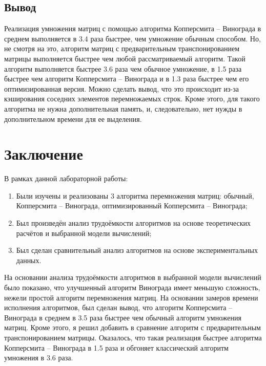 \documentclass[12pt]{report}
\begin{document}
\section{Вывод}

Реализация умножения матриц с помощью алгоритма Копперсмита -- Винограда в среднем выполняется в 3.4 раза быстрее, чем умножение обычным способом. Но, не смотря на это, алгоритм матриц с предварительным транспонированием матрицы выполняется быстрее чем любой рассматриваемый алгоритм. Такой алгоритм выполняется быстрее 3.6 раза чем обычное умножение, в 1.5 раза быстрее чем алгоритм Копперсмита -- Винограда и в 1.3 раза быстрее чем его оптимизированная версия. Можно сделать вывод, что это происходит из-за кэширования соседних элементов перемножаемых строк. Кроме этого, для такого алгоритма не нужна дополнительная память, и, следовательно, нет нужды в дополнительном времени для ее выделения.

\chapter*{Заключение}

В рамках данной лабораторной работы:

\begin{enumerate}
	\item Были изучены и реализованы 3 алгоритма перемножения матриц: обычный, Копперсмита -- Винограда, оптимизированный Копперсмита -- Винограда;
	\item Был произведён анализ трудоёмкости алгоритмов на основе теоретических расчётов и выбранной модели вычислений;
	\item Был сделан сравнительный анализ алгоритмов на основе экспериментальных данных.
\end{enumerate}

На основании анализа трудоёмкости алгоритмов в выбранной модели вычислений было показано, что улучшенный алгоритм Винограда имеет меньшую сложность, нежели простой алгоритм перемножения матриц. На основании замеров времени исполнения алгоритмов, был сделан вывод, что алгоритм Копперсмита -- Винограда в среднем в 3.5 раза быстрее чем обычный алгоритм умножения матриц. Кроме этого, я решил добавить в сравнение алгоритм с предварительным транспонированием матрицы. Оказалось, что такая реализация быстрее алгоритма Копперсмита -- Винограда в 1.5 раза и обгоняет классический алгоритм умножения в 3.6 раза. 



\end{document}
